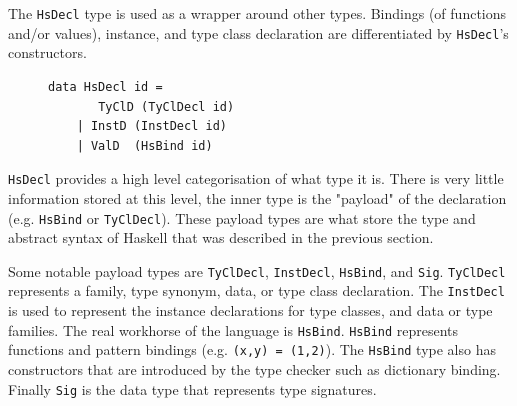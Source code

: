 The \texttt{HsDecl} type is \DIFdelbegin {}\DIFdelend used as a wrapper around other types. Bindings (of functions and/or values), instance, and type class declaration are differentiated by \texttt{HsDecl}'s constructors. \DIFaddbegin {}\texttt{} \DIFaddend 

\DIFdelbegin %
\DIFdelend \DIFaddbegin \begin{figure}
\begin{lstlisting}
data HsDecl id =
	   TyClD (TyClDecl id)
	| InstD (InstDecl id)
	| ValD  (HsBind id)
\end{lstlisting}
\caption{\texttt{}}
\label{hsdecl}
\end{figure}
\DIFaddend 

\texttt{HsDecl} \DIFdelbegin {}\DIFdelend provides a high level categorisation of what type it is. There is very little information stored at this level, the inner type is the "payload" of the declaration (e.g. \texttt{HsBind} or \texttt{TyClDecl}). These payload types are what store the type and \DIFdelbegin {}\DIFdelend \DIFaddbegin {}\DIFaddend abstract syntax of Haskell that was described in the previous section.

Some notable payload types are \texttt{TyClDecl}, \texttt{InstDecl}, \texttt{HsBind}, and \texttt{Sig}. \texttt{TyClDecl} represents a family, type synonym, data, or type class declaration. The \texttt{InstDecl} is used to represent the instance declarations for type classes, and data or type families. The real workhorse of the language is \texttt{HsBind}. \texttt{HsBind} represents functions and pattern bindings (e.g. \texttt{(x,y) = (1,2)}). The \texttt{HsBind} type also has constructors that are introduced by the type checker such as dictionary binding. Finally \texttt{Sig} is the data type that represents type signatures. 

\DIFaddbegin {}

